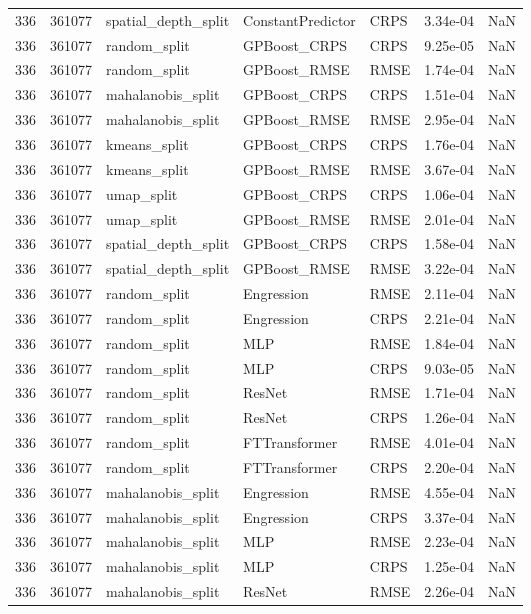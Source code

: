 \begin{tabular}{rrlllrr}
336 & 361077 & spatial\_depth\_split & ConstantPredictor & CRPS & 3.34e-04 & NaN \\
336 & 361077 & random\_split & GPBoost\_CRPS & CRPS & 9.25e-05 & NaN \\
336 & 361077 & random\_split & GPBoost\_RMSE & RMSE & 1.74e-04 & NaN \\
336 & 361077 & mahalanobis\_split & GPBoost\_CRPS & CRPS & 1.51e-04 & NaN \\
336 & 361077 & mahalanobis\_split & GPBoost\_RMSE & RMSE & 2.95e-04 & NaN \\
336 & 361077 & kmeans\_split & GPBoost\_CRPS & CRPS & 1.76e-04 & NaN \\
336 & 361077 & kmeans\_split & GPBoost\_RMSE & RMSE & 3.67e-04 & NaN \\
336 & 361077 & umap\_split & GPBoost\_CRPS & CRPS & 1.06e-04 & NaN \\
336 & 361077 & umap\_split & GPBoost\_RMSE & RMSE & 2.01e-04 & NaN \\
336 & 361077 & spatial\_depth\_split & GPBoost\_CRPS & CRPS & 1.58e-04 & NaN \\
336 & 361077 & spatial\_depth\_split & GPBoost\_RMSE & RMSE & 3.22e-04 & NaN \\
336 & 361077 & random\_split & Engression & RMSE & 2.11e-04 & NaN \\
336 & 361077 & random\_split & Engression & CRPS & 2.21e-04 & NaN \\
336 & 361077 & random\_split & MLP & RMSE & 1.84e-04 & NaN \\
336 & 361077 & random\_split & MLP & CRPS & 9.03e-05 & NaN \\
336 & 361077 & random\_split & ResNet & RMSE & 1.71e-04 & NaN \\
336 & 361077 & random\_split & ResNet & CRPS & 1.26e-04 & NaN \\
336 & 361077 & random\_split & FTTransformer & RMSE & 4.01e-04 & NaN \\
336 & 361077 & random\_split & FTTransformer & CRPS & 2.20e-04 & NaN \\
336 & 361077 & mahalanobis\_split & Engression & RMSE & 4.55e-04 & NaN \\
336 & 361077 & mahalanobis\_split & Engression & CRPS & 3.37e-04 & NaN \\
336 & 361077 & mahalanobis\_split & MLP & RMSE & 2.23e-04 & NaN \\
336 & 361077 & mahalanobis\_split & MLP & CRPS & 1.25e-04 & NaN \\
336 & 361077 & mahalanobis\_split & ResNet & RMSE & 2.26e-04 & NaN \\

\end{tabular}

